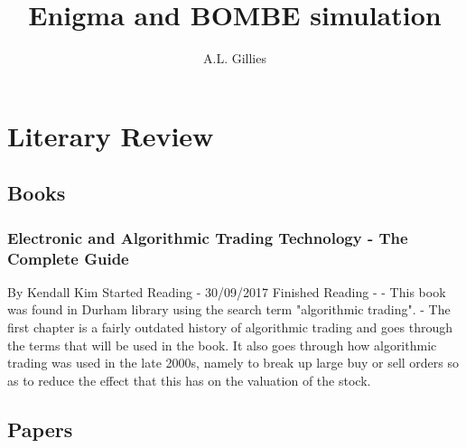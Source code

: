 \documentclass[12pt,a4paper]{article}
\title{Enigma and BOMBE simulation}
\author{A.L. Gillies}
\date{}
\begin{document}
\maketitle

\section*{Literary Review}

\subsection*{Books}

\subsubsection*{Electronic and Algorithmic Trading Technology - The Complete Guide}
By Kendall Kim \newline
Started Reading - 30/09/2017 \newline
Finished Reading -  \newline
\newline
- This book was found in Durham library using the search term "algorithmic trading". \newline
- The first chapter is a fairly outdated history of algorithmic trading and goes through the terms that will be used in the book. It also goes through how algorithmic trading was used in the late 2000s, namely to break up large buy or sell orders so as to reduce the effect that this has on the valuation of the stock.

\subsection*{Papers}
\end{document}
